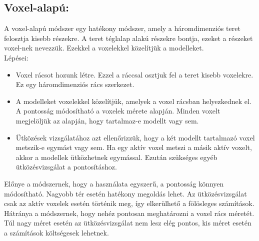 \subsection{Voxel-alapú:}
A voxel-alapú módszer egy hatékony módszer, amely a háromdimenziós teret felosztja kisebb részekre. A teret téglalap alakú részekre bontja, ezeket a részeket voxel-nek nevezzük.
Ezekkel a voxelekkel közelítjük a modelleket.
\\
Lépései:
\begin{itemize}
\item Voxel rácsot hozunk létre. Ezzel a ráccsal osztjuk fel a teret kisebb voxelekre. Ez egy háromdimenziós rács szerkezet.

\item A modelleket voxelekkel közelítjük, amelyek a voxel rácsban helyezkednek el. A pontosság módosítható a voxelek mérete alapján. Minden voxelt megjelöljük az alapján, hogy tartalmaz-e modellt vagy sem.

\item Ütközések vizsgálatához azt ellenőrizzük, hogy a két modellt tartalmazó voxel metszik-e egymást vagy sem. Ha egy aktív voxel metszi a másik aktív voxelt, akkor a modellek ütközhetnek egymással. Ezután szükséges egyéb ütközésvizsgálat a pontosításhoz.
\end{itemize}
Előnye a módszernek, hogy a használata egyszerű, a pontosság könnyen módosítható. Nagyobb tér esetén hatékony megoldás lehet. Az ütközésvizsgálat csak az aktív voxelek esetén történik meg, így elkerülhető a fölösleges számítások.\\
Hátránya a módszernek, hogy nehéz pontosan meghatározni a voxel rács méretét. Túl nagy méret esetén az ütközésvizsgálat nem lesz elég pontos, kis méret esetén a számítások költségesek lehetnek.

